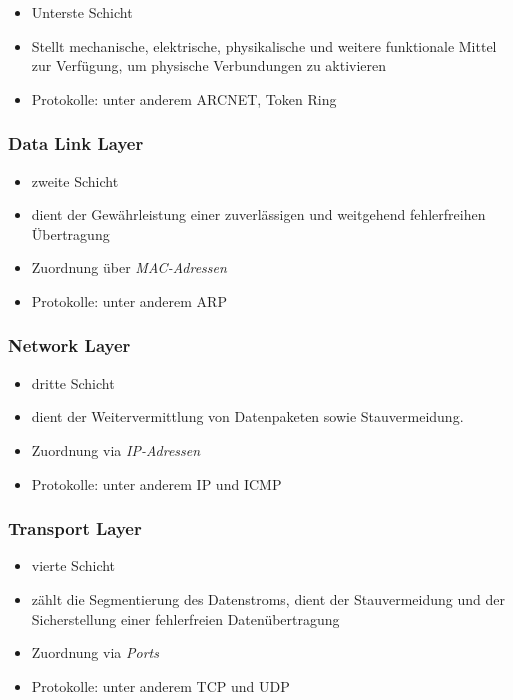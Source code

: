 \documentclass[a4paper, 12pt]{report}
\begin{document}
\begin{itemize}
    \item Unterste Schicht
    \item Stellt mechanische, elektrische, physikalische und weitere funktionale
    Mittel zur Verfügung, um physische Verbundungen zu aktivieren
    \item Protokolle: unter anderem ARCNET, Token Ring
\end{itemize}

\subsubsection{Data Link Layer}

\begin{itemize}
    \item zweite Schicht
    \item dient der Gewährleistung einer zuverlässigen und weitgehend
	fehlerfreihen Übertragung
    \item Zuordnung über \emph{MAC-Adressen}
    \item Protokolle: unter anderem ARP
\end{itemize}

\subsubsection{Network Layer}

\begin{itemize}
    \item dritte Schicht
    \item dient der Weitervermittlung von Datenpaketen sowie Stauvermeidung.
    \item Zuordnung via \emph{IP-Adressen}
    \item Protokolle: unter anderem IP und ICMP
\end{itemize}

\subsubsection{Transport Layer}

\begin{itemize}
    \item vierte Schicht
    \item zählt die Segmentierung des Datenstroms, dient der Stauvermeidung und
	der Sicherstellung einer fehlerfreien Datenübertragung
    \item Zuordnung via \emph{Ports}
    \item Protokolle: unter anderem TCP und UDP
\end{itemize}
\end{document}
